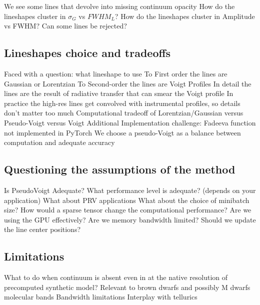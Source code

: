 \documentclass[modern]{aastex631}
\begin{document}
\begin{outline}
    \1 We see some lines that devolve into missing continuum opacity
    \1 How do the lineshapes cluster in $\sigma_G$ vs $FWHM_L$?
    \1 How do the lineshapes cluster in Amplitude vs FWHM? Can some lines be rejected?
\end{outline}


\subsection{Lineshapes choice and tradeoffs}
\begin{outline}
    \1 Faced with a question: what lineshape to use
    \2 To First order the lines are Gaussian or Lorentzian
    \2 To Second-order the lines are Voigt Profiles
    \2 In detail the lines are the result of radiative transfer that can smear the Voigt profile
    \2 In practice the high-res lines get convolved with instrumental profiles, so details don't matter too much
    \1 Computational tradeoff of Lorentzian/Gaussian versus Pseudo-Voigt versus Voigt
    \2 Additional Implementation challenge: Fadeeva function not implemented in PyTorch
    \1 We choose a pseudo-Voigt as a balance between computation and adequate accuracy
\end{outline}

\subsection{Questioning the assumptions of the method}

\begin{outline}
    \1 Is PseudoVoigt Adequate?
    \1 What performance level is adequate? (depends on your application)
    \1 What about PRV applications
    \1 What about the choice of minibatch size?
    \1 How would a sparse tensor change the computational performance?
    \1 Are we using the GPU effectively? Are we memory bandwidth limited?
    \1 Should we update the line center positions?
\end{outline}

\subsection{Limitations}
\begin{outline}
    \1 What to do when continuum is absent even in at the native resolution of precomputed synthetic model?
    \1 Relevant to brown dwarfs and possibly M dwarfs molecular bands
    \1 Bandwidth limitations
    \1 Interplay with tellurics
\end{outline}
\end{document}
